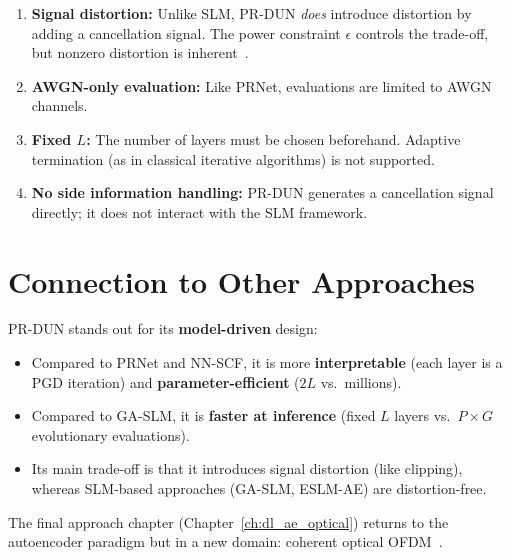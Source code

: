 \begin{enumerate}
    \item \textbf{Signal distortion:}
          Unlike SLM, PR-DUN \emph{does} introduce distortion by adding
          a cancellation signal.  The power constraint $\epsilon$ controls
          the trade-off, but nonzero distortion is inherent~\cite{nguyen2022deep}.

    \item \textbf{AWGN-only evaluation:}
          Like PRNet, evaluations are limited to AWGN channels.

    \item \textbf{Fixed $L$:}
          The number of layers must be chosen beforehand.
          Adaptive termination (as in classical iterative algorithms)
          is not supported.

    \item \textbf{No side information handling:}
          PR-DUN generates a cancellation signal directly;
          it does not interact with the SLM framework.
\end{enumerate}


\section{Connection to Other Approaches}
\label{sec:prdun_connections}

PR-DUN stands out for its \textbf{model-driven} design:
\begin{itemize}
    \item Compared to PRNet and NN-SCF, it is more \textbf{interpretable}
          (each layer is a PGD iteration) and \textbf{parameter-efficient}
          ($2L$ vs.\ millions).
    \item Compared to GA-SLM, it is \textbf{faster at inference}
          (fixed $L$ layers vs.\ $P \times G$ evolutionary evaluations).
    \item Its main trade-off is that it introduces signal distortion
          (like clipping), whereas SLM-based approaches (GA-SLM, ESLM-AE)
          are distortion-free.
\end{itemize}

The final approach chapter (Chapter~\ref{ch:dl_ae_optical}) returns to
the autoencoder paradigm but in a new domain: coherent optical OFDM~\cite{alnaseri2025deep}.
